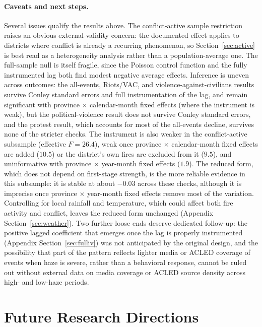 \documentclass[12pt]{article}
\begin{document}
\paragraph{Caveats and next steps.} Several issues qualify the results above. The conflict-active sample restriction raises an obvious external-validity concern: the documented effect applies to districts where conflict is already a recurring phenomenon, so Section~\ref{sec:active} is best read as a heterogeneity analysis rather than a population-average one. The full-sample null is itself fragile, since the Poisson control function and the fully instrumented lag both find modest negative average effects. Inference is uneven across outcomes: the all-events, Riots/VAC, and violence-against-civilians results survive Conley standard errors and full instrumentation of the lag, and remain significant with province $\times$ calendar-month fixed effects (where the instrument is weak), but the political-violence result does not survive Conley standard errors, and the protest result, which accounts for most of the all-events decline, survives none of the stricter checks. The instrument is also weaker in the conflict-active subsample (effective $F = 26.4$), weak once province $\times$ calendar-month fixed effects are added ($10.5$) or the district's own fires are excluded from it ($9.5$), and uninformative with province $\times$ year-month fixed effects ($1.9$). The reduced form, which does not depend on first-stage strength, is the more reliable evidence in this subsample: it is stable at about $-0.03$ across these checks, although it is imprecise once province $\times$ year-month fixed effects remove most of the variation. Controlling for local rainfall and temperature, which could affect both fire activity and conflict, leaves the reduced form unchanged (Appendix Section~\ref{sec:weather}). Two further loose ends deserve dedicated follow-up: the positive lagged coefficient that emerges once the lag is properly instrumented (Appendix Section~\ref{sec:fulliv}) was not anticipated by the original design, and the possibility that part of the pattern reflects lighter media or ACLED coverage of events when haze is severe, rather than a behavioral response, cannot be ruled out without external data on media coverage or ACLED source density across high- and low-haze periods.

\section{Future Research Directions}
\label{sec:future}
\end{document}
